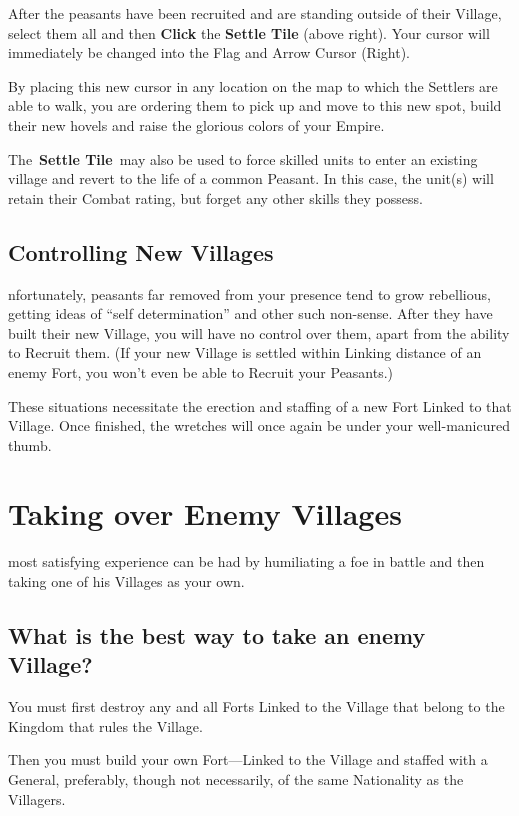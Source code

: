 After the peasants have been recruited and are standing outside of their Village, select them all and then \textbf{Click} the \textbf{Settle Tile} (above right). Your cursor will immediately be changed into the Flag and Arrow Cursor (Right).

By placing this new cursor in any location on the map to which the Settlers are able to walk, you are ordering them to pick up and move to this new spot, build their new hovels and raise the glorious colors of your Empire.

The \textbf{Settle Tile} may also be used to force skilled units to enter an existing village and revert to the life of a common Peasant. In this case, the unit(s) will retain their Combat rating, but forget any other skills they possess.

\subsection{Controlling New Villages}

nfortunately, peasants far removed from your presence tend to grow rebellious, getting ideas of “self determination” and other such non-sense. After they have built their new Village, you will have no control over them, apart from the ability to Recruit them. (If your new Village is settled within Linking distance of an enemy Fort, you won’t even be able to Recruit your Peasants.)

These situations necessitate the erection and staffing of a new Fort Linked to that Village. Once finished, the wretches will once again be under your well-manicured thumb.

\section{Taking over Enemy Villages}

 most satisfying experience can be had by humiliating a foe in battle and then taking one of his Villages as your own.

\subsection{What is the best way to take an enemy Village?}

You must first destroy any and all Forts Linked to the Village that belong to the Kingdom that rules the Village.

Then you must build your own Fort---Linked to the Village and staffed with a General, preferably, though not necessarily, of the same Nationality as the Villagers.

